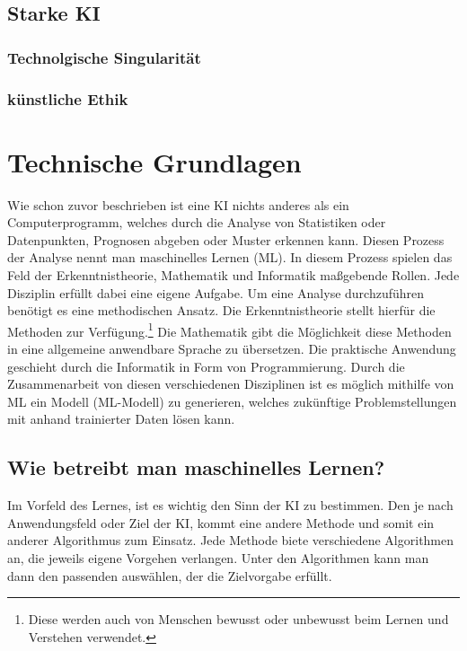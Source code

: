 \documentclass[12pt,german,ngerman]{report}
\begin{document}
        \subsection{}
    \section{Starke KI}
        \subsection{Technolgische Singularität}
        \subsection{künstliche Ethik}

\chapter{Technische Grundlagen}
     Wie schon zuvor beschrieben ist eine KI nichts anderes als ein Computerprogramm,
     welches durch die Analyse von Statistiken oder Datenpunkten, Prognosen abgeben oder Muster erkennen kann.
     Diesen Prozess der Analyse nennt man maschinelles Lernen (ML).
     In diesem Prozess spielen das Feld der Erkenntnistheorie, Mathematik und Informatik 
     maßgebende Rollen. Jede Disziplin erfüllt dabei eine eigene Aufgabe.
     Um eine Analyse durchzuführen benötigt es eine methodischen Ansatz.
     Die Erkenntnistheorie stellt hierfür die Methoden zur Verfügung.\footnote{Diese werden auch von 
     Menschen bewusst oder unbewusst beim Lernen und Verstehen verwendet.}
     Die Mathematik gibt die Möglichkeit diese Methoden in eine allgemeine anwendbare Sprache zu übersetzen.
     Die praktische Anwendung geschieht durch die Informatik in Form von Programmierung.
     Durch die Zusammenarbeit von diesen verschiedenen Disziplinen ist es
     möglich mithilfe von ML ein Modell (ML-Modell) zu generieren,
     welches zukünftige Problemstellungen mit anhand trainierter Daten lösen kann.
        
    \section{Wie betreibt man maschinelles Lernen?}
        Im Vorfeld des Lernes, ist es wichtig den Sinn der KI zu bestimmen.
        Den je nach Anwendungsfeld oder Ziel der KI, kommt eine andere Methode und somit
        ein anderer Algorithmus zum Einsatz. Jede Methode biete verschiedene Algorithmen
        an, die jeweils eigene Vorgehen verlangen. Unter den Algorithmen kann man
        dann den passenden auswählen, der die Zielvorgabe erfüllt.
\end{document}
